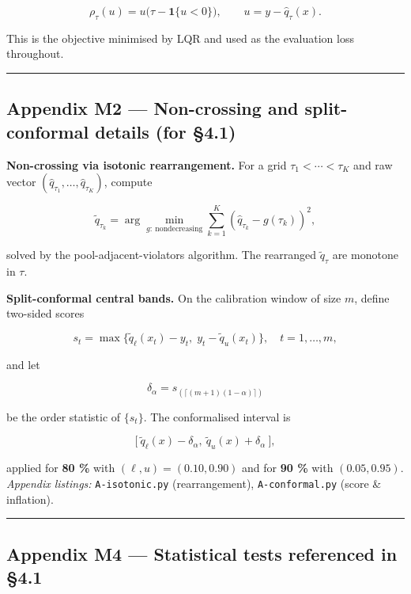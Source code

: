 \documentclass[
  a4paper,
  DIV=11,
  numbers=noendperiod]{scrreprt}
\begin{document}
\[
\label{eq-pinball}
\rho_\tau(u)=u\big(\tau-\mathbf{1}\{u<0\}\big),\qquad u=y-\widehat q_\tau(x).
\]

This is the objective minimised by LQR and used as the evaluation loss
throughout.

\begin{center}\rule{0.5\linewidth}{0.5pt}\end{center}

\subsection{Appendix M2 --- Non-crossing and split-conformal details
(for §4.1)}\label{app-m2-calibration}

\textbf{Non-crossing via isotonic rearrangement.} For a grid
\(\tau_1<\cdots<\tau_K\) and raw vector
\((\widehat q_{\tau_1},\ldots,\widehat q_{\tau_K})\), compute

\[
\label{eq-isotonic}
\widetilde q_{\tau_k}
=\arg\min_{g:\ \text{nondecreasing}}
\sum_{k=1}^{K}\left(\widehat q_{\tau_k}-g(\tau_k)\right)^2,
\]

solved by the pool-adjacent-violators algorithm. The rearranged
\(\widetilde q_{\tau}\) are monotone in \(\tau\).

\textbf{Split-conformal central bands.} On the calibration window of
size \(m\), define two-sided scores

\[
\label{eq-conformal-score}
s_t=\max\{\widetilde q_{\ell}(x_t)-y_t,\; y_t-\widetilde q_{u}(x_t)\},\quad t=1,\ldots,m,
\]

and let

\[
\label{eq-conformal-delta}
\delta_\alpha = s_{(\lceil (m+1)(1-\alpha)\rceil)}
\]

be the order statistic of \(\{s_t\}\). The conformalised interval is

\[
\label{eq-conformal-band}
\big[\ \widetilde q_{\ell}(x)-\delta_\alpha,\ \widetilde q_{u}(x)+\delta_\alpha\ \big],
\]

applied for \textbf{80 \%} with \((\ell,u)=(0.10,0.90)\) and for
\textbf{90 \%} with \((0.05,0.95)\). \emph{Appendix listings:}
\texttt{A-isotonic.py} (rearrangement), \texttt{A-conformal.py} (score
\& inflation).

\begin{center}\rule{0.5\linewidth}{0.5pt}\end{center}

\subsection{Appendix M4 --- Statistical tests referenced in
§4.1}\label{app-m4-tests}
\end{document}

